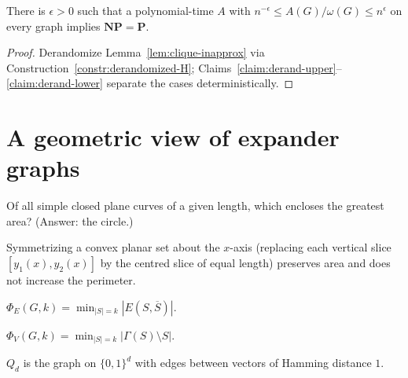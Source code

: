 \begin{theorem}[3.13, Clique inapproximability, $\mathbf{NP}=\mathbf{P}$]
  \label{thm:clique-inapprox}
  There is $\epsilon>0$ such that a polynomial-time $A$ with $n^{-\epsilon}\le
  A(G)/\omega(G)\le n^{\epsilon}$ on every graph implies $\mathbf{NP}=\mathbf{P}$.
\end{theorem}
\begin{proof}
  Derandomize Lemma~\ref{lem:clique-inapprox} via
  Construction~\ref{constr:derandomized-H};
  Claims~\ref{claim:derand-upper}--\ref{claim:derand-lower} separate the cases
  deterministically.
\end{proof}


\chapter{A geometric view of expander graphs}

\begin{problem}
  \label{prob:classical-isoperimetric}
  Of all simple closed plane curves of a given length, which encloses the
  greatest area? (Answer: the circle.)
\end{problem}

\begin{construction}
  \label{constr:steiner}
  Symmetrizing a convex planar set about the $x$-axis (replacing each vertical
  slice $[y_1(x),y_2(x)]$ by the centred slice of equal length) preserves area
  and does not increase the perimeter.
\end{construction}

\begin{definition}
  \label{def:edge-iso}
  $\Phi_E(G,k)=\min_{|S|=k}|E(S,\overline S)|$.
\end{definition}

\begin{definition}
  \label{def:vertex-iso}
  $\Phi_V(G,k)=\min_{|S|=k}|\Gamma(S)\setminus S|$.
\end{definition}

\begin{definition}
  \label{def:discrete-cube}
  $Q_d$ is the graph on $\{0,1\}^d$ with edges between vectors of Hamming
  distance $1$.
\end{definition}

